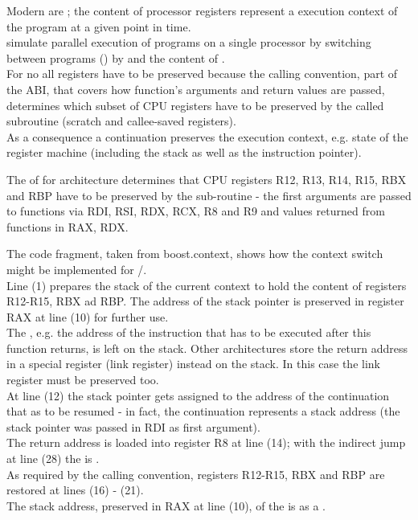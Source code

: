 \label{mechanism}

Modern  are ; the content of
processor registers represent a execution context of the program at a given
point in time.\\
 simulate parallel execution of programs on a single
processor by switching between programs () by
 and  the content of .\\

For \cc no all registers have to be preserved because the calling convention,
part of the ABI, that covers how function's arguments and return values are
passed, determines which subset of CPU registers have to be preserved by the
called subroutine (scratch and callee-saved registers).\\

As a consequence a continuation preserves the execution context, e.g. state of
the register machine (including the stack as well as the instruction pointer).

The \cite{SYSVABI} of  for 
architecture determines that CPU registers R12, R13, R14, R15, RBX and RBP have
to be preserved by the sub-routine - the first arguments are passed to functions
via RDI, RSI, RDX, RCX, R8 and R9 and values returned from functions in RAX,
RDX.\\


The code fragment, taken from boost.context\cite{bcontext}, shows how the
context switch might be implemented for /.\\
Line (1) prepares the stack of the current context to hold the content of
registers R12-R15, RBX ad RBP. The address of the stack pointer is preserved in
register RAX at line (10) for further use.\\
The , e.g. the address of the instruction that has to be
executed after this function returns, is left on the stack. Other architectures
store the return address in a special register (link register) instead on the
stack. In this case the link register must be preserved too.\\
At line (12) the stack pointer gets assigned to the address of the
continuation that as to be resumed - in fact, the continuation represents a
stack address (the stack pointer was passed in RDI as first argument).\\
The return address is loaded into register R8 at line (14); with the indirect
jump at line (28) the  is .\\
As required by the calling convention, registers R12-R15, RBX and RBP are
restored at lines (16) - (21).\\
The stack address, preserved in RAX at line (10), of the
 is  as a .
